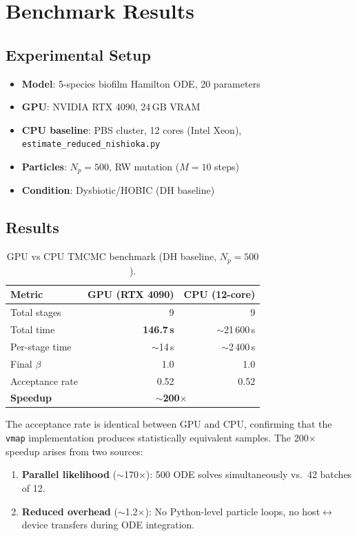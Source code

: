 \documentclass[11pt,a4paper]{article}
\begin{document}
\section{Benchmark Results}
\label{sec:gpu_benchmark}

\subsection{Experimental Setup}

\begin{itemize}
  \item \textbf{Model}: 5-species biofilm Hamilton ODE, 20 parameters
  \item \textbf{GPU}: NVIDIA RTX 4090, 24\,GB VRAM
  \item \textbf{CPU baseline}: PBS cluster, 12 cores (Intel Xeon),
    \texttt{estimate\_reduced\_nishioka.py}
  \item \textbf{Particles}: $N_p = 500$, RW mutation ($M = 10$ steps)
  \item \textbf{Condition}: Dysbiotic/HOBIC (DH baseline)
\end{itemize}

\subsection{Results}

\begin{table}[htbp]
\centering
\caption{GPU vs CPU TMCMC benchmark (DH baseline, $N_p = 500$).}
\label{tab:gpu_benchmark}
\begin{tabular}{@{}lrr@{}}
\toprule
\textbf{Metric} & \textbf{GPU (RTX 4090)} & \textbf{CPU (12-core)} \\
\midrule
Total stages & 9 & 9 \\
Total time & \textbf{146.7\,s} & $\sim$21\,600\,s \\
Per-stage time & $\sim$14\,s & $\sim$2\,400\,s \\
Final $\beta$ & 1.0 & 1.0 \\
Acceptance rate & 0.52 & 0.52 \\
\midrule
\textbf{Speedup} & \multicolumn{2}{c}{\textbf{$\sim$200$\times$}} \\
\bottomrule
\end{tabular}
\end{table}

The acceptance rate is identical between GPU and CPU, confirming that the
\texttt{vmap} implementation produces statistically equivalent samples.
The 200$\times$ speedup arises from two sources:
\begin{enumerate}
  \item \textbf{Parallel likelihood} ($\sim$170$\times$): 500 ODE solves
    simultaneously vs.\ 42 batches of 12.
  \item \textbf{Reduced overhead} ($\sim$1.2$\times$): No Python-level
    particle loops, no host$\leftrightarrow$device transfers during ODE integration.
\end{enumerate}
\end{document}

